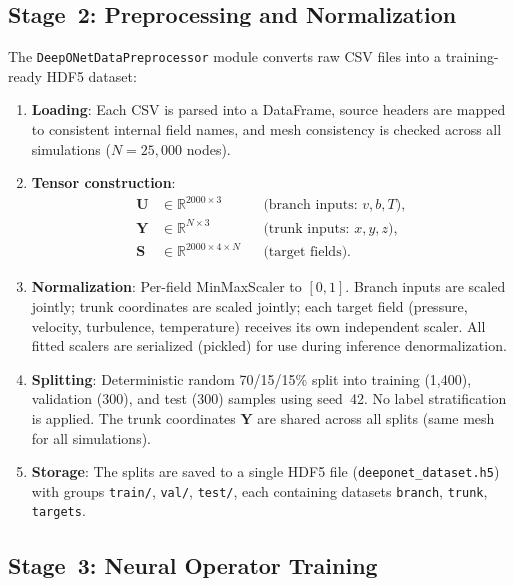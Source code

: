 \documentclass[journal]{IEEEtran}
\newcommand{\added}[1]{#1}
\begin{document}
\subsection{Stage~2: Preprocessing and Normalization}

The \texttt{DeepONetDataPreprocessor} module converts raw CSV files into a training-ready HDF5 dataset:

\begin{enumerate}
    \item \textbf{Loading}: Each CSV is parsed into a DataFrame, source headers are mapped to consistent internal field names, and mesh consistency is checked across all simulations ($N=25{,}000$ nodes).
    
    \item \textbf{Tensor construction}:
    \begin{align}
    \bm{U} &\in \mathbb{R}^{2000 \times 3} && \text{(branch inputs: $v,b,T$)}, \\
    \bm{Y} &\in \mathbb{R}^{N \times 3} && \text{(trunk inputs: $x,y,z$)}, \\
    \bm{S} &\in \mathbb{R}^{2000 \times 4 \times N} && \text{(target fields)}.
    \end{align}
    
    \item \textbf{Normalization}: Per-field MinMaxScaler to $[0,1]$. Branch inputs are scaled jointly; trunk coordinates are scaled jointly; each target field (pressure, velocity, turbulence, temperature) receives its own independent scaler. All fitted scalers are serialized (pickled) for use during inference denormalization.
    
    \item \added{\textbf{Splitting}: Deterministic random 70/15/15\% split into training (1,400), validation (300), and test (300) samples using seed~42. No label stratification is applied. The trunk coordinates $\bm{Y}$ are shared across all splits (same mesh for all simulations).}
    
    \item \textbf{Storage}: The splits are saved to a single HDF5 file (\texttt{deeponet\_dataset.h5}) with groups \texttt{train/}, \texttt{val/}, \texttt{test/}, each containing datasets \texttt{branch}, \texttt{trunk}, \texttt{targets}.
\end{enumerate}

\subsection{Stage~3: Neural Operator Training}
\end{document}
